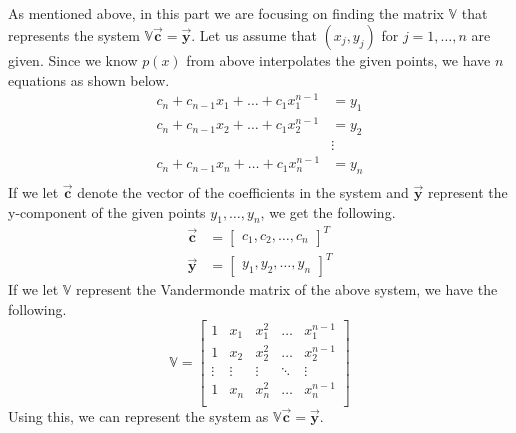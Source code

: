 \documentclass{article}
\begin{document}
\subsection{}
As mentioned above, in this part we are focusing on finding the matrix \(\mathbf{\mathbb{V}}\) that represents the system \(\mathbf{\mathbb{V}\Vec{c}} = \mathbf{\Vec{y}}\). Let us assume that \((x_j,y_j)\) for \(j=1,\dots,n\) are given. Since we know \(p(x)\) from above interpolates the given points, we have \(n\) equations as shown below.
\[
\begin{split}
    c_n + c_{n-1}x_1 + \dots + c_1x_1^{n-1} &= y_1 \\
    c_n + c_{n-1}x_2 + \dots + c_1x_2^{n-1} &= y_2 \\
    &\vdots \\
    c_n + c_{n-1}x_n + \dots + c_1x_n^{n-1} &= y_n \\
\end{split}
\]
If we let \(\mathbf{\Vec{c}}\) denote the vector of the coefficients in the system and \(\mathbf{\Vec{y}}\) represent the y-component of the given points \(y_1,\dots,y_n\), we get the following.
\[
\begin{split}
    \mathbf{\Vec{c}} &= \begin{bmatrix}
        c_1,c_2,\dots,c_n
    \end{bmatrix}^T \\
    \mathbf{\Vec{y}} &= \begin{bmatrix}
        y_1,y_2,\dots,y_n
    \end{bmatrix}^T
\end{split}
\]
If we let \(\mathbf{\mathbb{V}}\) represent the Vandermonde matrix of the above system, we have the following.
\[
\mathbf{\mathbb{V}} = \begin{bmatrix}
    1 & x_1 & x_1^2 & \dots & x_1^{n-1} \\
    1 & x_2 & x_2^2 & \dots & x_2^{n-1} \\
    \vdots & \vdots & \vdots & \ddots & \vdots \\
    1 & x_n & x_n^2 & \dots & x_n^{n-1} \\
\end{bmatrix}
\]
Using this, we can represent the system as \(\mathbf{\mathbb{V}\Vec{c}} = \mathbf{\Vec{y}}\).
\end{document}
